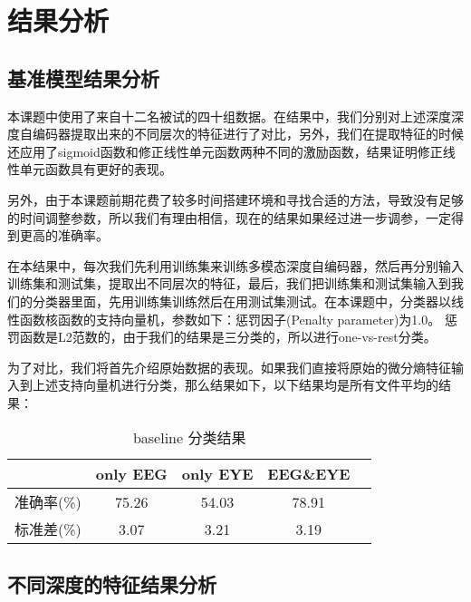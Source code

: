 
\chapter{结果分析}
\label{chap:chap7}
	
\section{基准模型结果分析}

	本课题中使用了来自十二名被试的四十组数据。在结果中，我们分别对上述深度深度自编码器提取出来的不同层次的特征进行了对比，另外，我们在提取特征的时候还应用了sigmoid函数和修正线性单元函数两种不同的激励函数，结果证明修正线性单元函数具有更好的表现。
	
	另外，由于本课题前期花费了较多时间搭建环境和寻找合适的方法，导致没有足够的时间调整参数，所以我们有理由相信，现在的结果如果经过进一步调参，一定得到更高的准确率。
	
	在本结果中，每次我们先利用训练集来训练多模态深度自编码器，然后再分别输入训练集和测试集，提取出不同层次的特征，最后，我们把训练集和测试集输入到我们的分类器里面，先用训练集训练然后在用测试集测试。在本课题中，分类器以线性函数核函数的支持向量机，参数如下：惩罚因子(Penalty parameter)为1.0。 惩罚函数是L2范数的，由于我们的结果是三分类的，所以进行one-vs-rest分类。
	
	为了对比，我们将首先介绍原始数据的表现。如果我们直接将原始的微分熵特征输入到上述支持向量机进行分类，那么结果如下，以下结果均是所有文件平均的结果：

	\begin{table}[!h]
	\centering
\begin{tabular}{|c|c|c|c|c|}
\hline
\hline
  & only EEG & only EYE & EEG\&EYE \\
\hline
准确率(\%) & 75.26 & 54.03 & 78.91\\
\hline
标准差(\%) & 3.07 & 3.21 & 3.19 \\
\hline
\end{tabular}
\caption{baseline 分类结果}
\end{table} 

\section{不同深度的特征结果分析}

